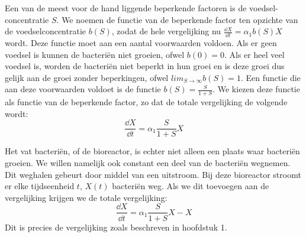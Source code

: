 Een van de meest voor de hand liggende beperkende factoren is de voedsel-concentratie $S$. We noemen de functie van de beperkende factor ten opzichte van de voedselconcentratie $b(S)$, zodat de hele vergelijking nu $\frac{\dd X}{\dd t} = \alpha_1b(S)X$ wordt. Deze functie moet aan een aantal voorwaarden voldoen. Als er geen voedsel is kunnen de bacteri\"en niet groeien, ofwel $b(0) = 0$. Als er heel veel voedsel is, worden de bacteri\"en niet beperkt in hun groei en is deze groei dus gelijk aan de groei zonder beperkingen, ofwel $lim_{S\rightarrow\infty}b(S)=1$.
Een functie die aan deze voorwaarden voldoet is de functie $b(S) = \frac{S}{1+S}$. We kiezen deze functie als functie van de beperkende factor, zo dat de totale vergelijking de volgende wordt:
\begin{equation*}
	\frac{\dd X} {\dd t} = \alpha_1 \frac{S}{1 + S} X
\end{equation*}

Het vat bacteri\"en, of de bioreactor, is echter niet alleen een plaats waar bacteri\"en groeien. We willen namelijk ook constant een deel van de bacteri\"en wegnemen. Dit weghalen gebeurt door middel van een uitstroom. Bij deze bioreactor stroomt er elke tijdseenheid $t$, $X(t)$ bacteri\"en weg. Als we dit toevoegen aan de vergelijking krijgen we de totale vergelijking:
\begin{equation}
	\frac{\dd X}{\dd t} = \alpha_1 \frac{S}{1+S} X - X 		\label{eq:bc1}
\end{equation}
Dit is precies de vergelijking zoals beschreven in hoofdstuk 1. 

